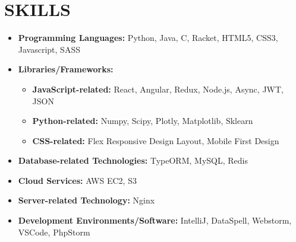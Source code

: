 \documentclass[a4paper,8pt]{extarticle}
\begin{document}
\section*{SKILLS}
\begin{itemize}
    \item \textbf{Programming Languages:} Python, Java, C, Racket, HTML5, CSS3, Javascript, SASS
    \item \textbf{Libraries/Frameworks:}
    \begin{itemize}
        \item \textbf{JavaScript-related:} React, Angular, Redux, Node.js, Async, JWT, JSON
        \item \textbf{Python-related:} Numpy, Scipy, Plotly, Matplotlib, Sklearn
        \item \textbf{CSS-related:} Flex Responsive Design Layout, Mobile First Design
    \end{itemize}
    \item \textbf{Database-related Technologies:} TypeORM, MySQL, Redis
    \item \textbf{Cloud Services:} AWS EC2, S3
    \item \textbf{Server-related Technology:} Nginx
    \item \textbf{Development Environments/Software:} IntelliJ, DataSpell, Webstorm, VSCode, PhpStorm
\end{itemize}

\end{document}
